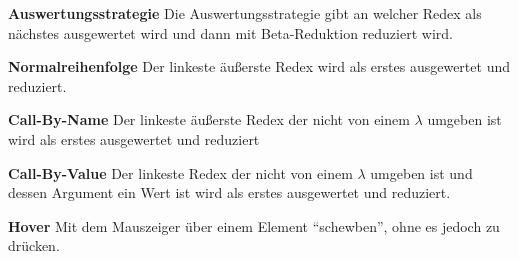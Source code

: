 \documentclass[parskip=full,11pt,twoside]{scrartcl}
\begin{document}
\textbf{Auswertungsstrategie}
Die Auswertungsstrategie gibt an welcher Redex als nächstes ausgewertet wird und dann mit Beta-Reduktion reduziert wird.

\textbf{Normalreihenfolge}
Der linkeste äußerste Redex wird als erstes ausgewertet und reduziert.

\textbf{Call-By-Name}
Der linkeste äußerste Redex der nicht von einem $\lambda$ umgeben ist wird als erstes ausgewertet und reduziert

\textbf{Call-By-Value}
Der linkeste Redex der nicht von einem $\lambda$ umgeben ist und dessen Argument ein Wert ist wird als erstes ausgewertet und reduziert.

\textbf{Hover}
Mit dem Mauszeiger über einem Element \enquote{schewben}, ohne es jedoch zu drücken.
 
\end{document}
